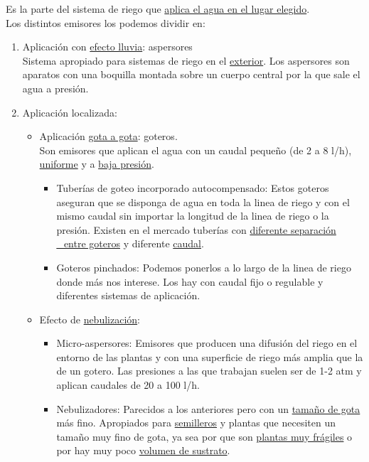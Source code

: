 \documentclass[a4paper,12pt,oneside]{article}
\begin{document}
\begin{enumerate}
Es la parte del sistema de riego que \uline{aplica el agua en el lugar elegido}.\\
Los distintos emisores los podemos dividir en:\\
\begin{enumerate}
\item Aplicación con \uline{efecto lluvia}: aspersores\\
Sistema apropiado para sistemas de riego en el \uline{exterior}. Los aspersores son
aparatos con una boquilla montada sobre un cuerpo central por la que sale el
agua a presión.
\item Aplicación localizada:
\begin{itemize}
\item Aplicación \uline{gota a gota}: goteros.\\
Son emisores que aplican el agua con un caudal pequeño (de 2 a 8
l/h), \uline{uniforme} y a \uline{baja presión}.
\begin{itemize}
\item Tuberías de goteo incorporado autocompensado: Estos goteros aseguran que
se disponga de agua en toda la linea de riego y con el mismo caudal sin
importar la longitud de la linea de riego o la presión. Existen en el
mercado tuberías con \uline{diferente separación \_entre goteros} y diferente \uline{caudal}.
\item Goteros pinchados: Podemos ponerlos a lo largo de la linea de riego donde
más nos interese. Los hay con caudal fijo o regulable y diferentes
sistemas de aplicación.
\end{itemize}
\item Efecto de \uline{nebulización}:
\begin{itemize}
\item Micro-aspersores:
Emisores que producen una difusión del riego en el entorno de las plantas y
con una superficie de riego más amplia que la de un gotero. Las presiones a
las que trabajan suelen ser de 1-2 atm y aplican caudales de 20 a 100 l/h.
\item Nebulizadores: Parecidos a los anteriores pero con un \uline{tamaño de gota}
más fino. Apropiados para \uline{semilleros} y plantas que necesiten un tamaño
muy fino de gota, ya sea por que son \uline{plantas muy frágiles} o por hay muy
poco \uline{volumen de sustrato}.
\end{itemize}
\end{itemize}
\end{enumerate}
\end{enumerate}
\end{document}
